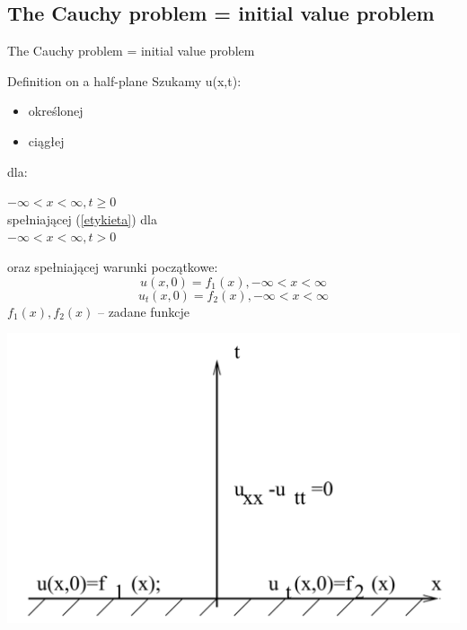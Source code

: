 \subsection{The Cauchy problem = initial value problem}
\begin{frame}{The Cauchy problem = initial value problem}

  \begin{block}{Definition on a half-plane}
  Szukamy u(x,t):
\begin{itemize}    
\item określonej
\item ciągłej
\end{itemize}
	 dla:
   
$-\infty < x < \infty, t \ge 0 $ \\
spełniającej (\ref{etykieta}) dla \\
$-\infty < x <\infty, t > 0 $


oraz spełniającej warunki początkowe:
\begin{equation}u(x,0) = f_1(x), -\infty < x < \infty\end{equation}
\begin{equation}u_t(x,0) = f_2(x), -\infty < x < \infty\end{equation}
$f_1(x), f_2(x) $ -- zadane funkcje
\end{block}
\end{frame}

\begin{frame}
  \centerline{\includegraphics[height = 0.85 \textheight]{img/23/cauchy}}
\end{frame}
